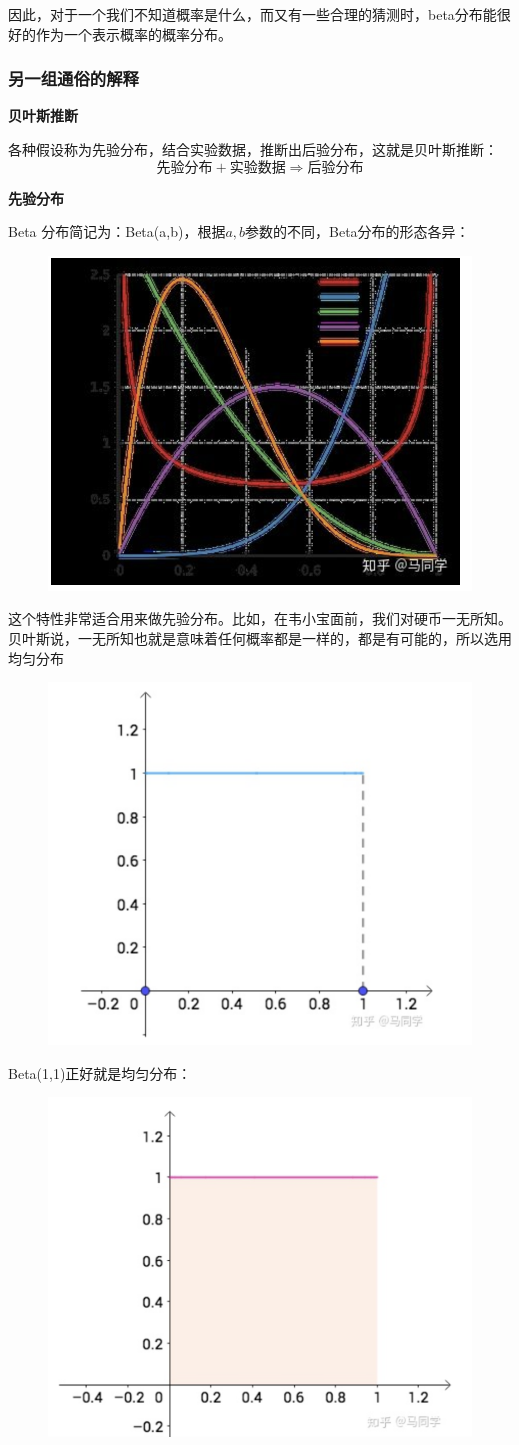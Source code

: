 \documentclass[12pt]{article}
\begin{document}
因此，对于一个我们不知道概率是什么，而又有一些合理的猜测时，beta分布能很好的作为一个表示概率的概率分布。

\subsubsection{另一组通俗的解释\cite{Commonly_Understand_Beta_Distribution_Ma}}
\textbf{贝叶斯推断}

各种假设称为先验分布，结合实验数据，推断出后验分布，这就是贝叶斯推断：
$$
\text{先验分布} + \text{实验数据} \Rightarrow \text{后验分布}
$$

\textbf{先验分布}

Beta 分布简记为：Beta(a,b)，根据$a, b$参数的不同，Beta分布的形态各异：
\begin{figure}[H]
  \centering
  \includegraphics[width=.5\textwidth]{fig/Beta_Distribution_Different_Examples.png} 
\end{figure}

这个特性非常适合用来做先验分布。比如，在韦小宝面前，我们对硬币一无所知。贝叶斯说，一无所知也就是意味着任何概率都是一样的，都是有可能的，所以选用均匀分布
\begin{figure}[H]
  \centering
  \includegraphics[width=.3\textwidth]{fig/Beta_Distribution_Ma_Example_1.png} 
\end{figure}

Beta(1,1)正好就是均匀分布：
\begin{figure}[H]
  \centering
  \includegraphics[width=.3\textwidth]{fig/Beta_Distribution_Ma_Example_2.png} 
\end{figure}
\end{document}
